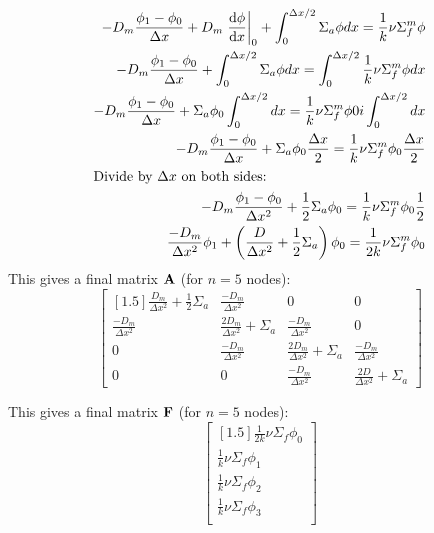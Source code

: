 \documentclass[../main.tex]{subfiles}
\begin{document}
	\begin{align*}
		-D_m \frac{\phi_1 - \phi_0}{\Delta x} + D_m \left. \dv{\phi}{x} \right|_0 + \int_0^{\Delta x / 2} 
			\Sigma_a \phi dx =   \frac{1}{k} \nu \Sigma^m_f \phi \\
		-D_m \frac{\phi_1 - \phi_0}{\Delta x} +  \int_0^{\Delta x / 2} 
			\Sigma_a \phi dx = \int_0^{\Delta x / 2}  \frac{1}{k} \nu \Sigma^m_f \phi dx \\
		-D_m \frac{\phi_1 - \phi_0}{\Delta x} + \Sigma_a \phi_0 \int_0^{\Delta x / 2}
			dx = \frac{1}{k} \nu \Sigma^m_f \phi0i \int_0^{\Delta x / 2} dx \\
			-D_m \frac{\phi_1 - \phi_0}{\Delta x} + \Sigma_a \phi_0  \frac{\Delta x}{2} = \frac{1}{k} \nu \Sigma^m_f \phi_0 \frac{\Delta x}{2} \\
	\intertext{Divide by $\Delta x$ on both sides:}
		-D_m \frac{\phi_1 - \phi_0}{\Delta x^2}  + \frac{1}{2} \Sigma_a \phi_0 =  \frac{1}{k} \nu \Sigma^m_f \phi_0 \frac{1}{2} \\
		\frac{-D_m}{\Delta x^2} \phi_1 + \left( \frac{D}{\Delta x^2} + \frac{1}{2} \Sigma_a \right) \phi_0 = \frac{1}{2k} \nu \Sigma^m_f \phi_0
	\end{align*}
	This gives a final matrix $\mathbf{A}$ (for $n=5$ nodes):
	\[
	\begin{bmatrix}[1.5]
		\frac{D_m}{\Delta x^2} + \frac{1}{2}\Sigma_a & \frac{-D_m}{\Delta x^2} & 0 & 0 \\
		\frac{-D_m}{\Delta x^2} & \frac{2D_m}{\Delta x^2} + \Sigma_a & \frac{-D_m}{\Delta x^2} & 0 \\
		0 & \frac{-D_m}{\Delta x^2} & \frac{2D_m}{\Delta x^2} + \Sigma_a & \frac{-D_m}{\Delta x^2} \\
		0 & 0 & \frac{-D_m}{\Delta x^2} & \frac{2D}{\Delta x^2} + \Sigma_a
	\end{bmatrix}
	\]


This gives a final matrix $\mathbf{F}$ (for $n=5$ nodes):
	\[
	\begin{bmatrix}[1.5]
		\frac{1}{2k} \nu \Sigma_f \phi_0  \\
		\frac{1}{k} \nu \Sigma_f \phi_1  \\
		\frac{1}{k} \nu \Sigma_f \phi_2  \\
		\frac{1}{k} \nu \Sigma_f \phi_3  \\
	\end{bmatrix}
	\]
\end{document}
